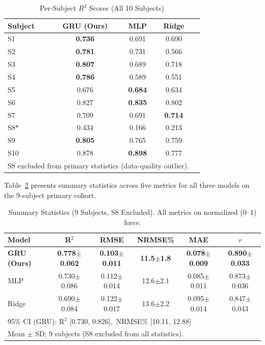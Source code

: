 \documentclass[journal]{IEEEtran}
\begin{document}
\begin{table}[!ht]
\centering
\caption{Per-Subject $R^2$ Scores (All 10 Subjects)}
\label{tab:per_subject}
\setlength{\tabcolsep}{5pt}
\begin{tabular}{lcccc}
\toprule
\textbf{Subject} & \textbf{GRU (Ours)} & \textbf{MLP} & \textbf{Ridge} \\
\midrule
S1  & \textbf{0.736} & 0.691 & 0.690 \\
S2  & \textbf{0.781} & 0.731 & 0.566 \\
S3  & \textbf{0.807} & 0.689 & 0.718 \\
S4  & \textbf{0.786} & 0.589 & 0.551 \\
S5  & 0.676 & \textbf{0.684} & 0.634 \\
S6  & 0.827 & \textbf{0.835} & 0.802 \\
S7  & 0.709 & 0.691 & \textbf{0.714} \\
S8* & 0.434 & 0.166 & 0.213 \\
S9  & \textbf{0.805} & 0.765 & 0.759 \\
S10 & 0.878 & \textbf{0.898} & 0.777 \\
\midrule
\multicolumn{4}{l}{\small * S8 excluded from primary statistics (data-quality outlier).} \\
\bottomrule
\end{tabular}
\end{table}

Table~\ref{tab:summary} presents summary statistics across five metrics
for all three models on the 9-subject primary cohort.

\begin{table}[!ht]
\centering
\caption{Summary Statistics (9 Subjects, S8 Excluded).
  All metrics on normalized (0--1) force.}
\label{tab:summary}
\setlength{\tabcolsep}{2.5pt}
\begin{tabular}{lccccc}
\toprule
\textbf{Model} & \textbf{R$^2$} & \textbf{RMSE} & \textbf{NRMSE\%} & \textbf{MAE} & \textbf{$r$} \\
\midrule
\textbf{GRU (Ours)} & \textbf{0.778$\pm$0.062} & \textbf{0.103$\pm$0.011} & \textbf{11.5$\pm$1.8} & \textbf{0.078$\pm$0.009} & \textbf{0.890$\pm$0.033} \\
MLP           & 0.730$\pm$0.086 & 0.112$\pm$0.014 & 12.6$\pm$2.1 & 0.085$\pm$0.011 & 0.873$\pm$0.036 \\
Ridge         & 0.690$\pm$0.084 & 0.122$\pm$0.017 & 13.6$\pm$2.2 & 0.095$\pm$0.014 & 0.847$\pm$0.043 \\
\midrule
\multicolumn{6}{l}{\small 95\% CI (GRU): R$^2$ [0.730, 0.826],\ NRMSE\% [10.11, 12.88]} \\
\multicolumn{6}{l}{\small Mean $\pm$ SD; 9 subjects (S8 excluded from all statistics).} \\
\bottomrule
\end{tabular}
\end{table}
\end{document}
